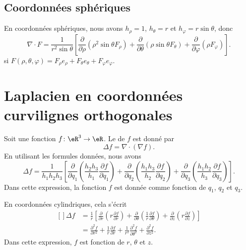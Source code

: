 \subsection{Coordonnées sphériques}

En coordonnées sphériques, nous avons $h_{\rho}=1$, $h_{\theta}=r$ et $h_{\varphi}=r\sin\theta$, donc
\begin{equation}
    \nabla\cdot F=\frac{1}{ r^2\sin\theta }\left[ \frac{ \partial  }{ \partial \rho }(\rho^2\sin\theta F_{\rho})+\frac{ \partial  }{ \partial \theta }(\rho\sin\theta F_{\theta})+\frac{ \partial  }{ \partial \varphi }(\rho F_{\varphi}) \right].
\end{equation}
si $F(\rho,\theta,\varphi)=F_{\rho}e_{\rho}+F_{\theta}e_{\theta}+F_{\varphi}e_{\varphi}$.

\section{Laplacien en coordonnées curvilignes orthogonales}

Soit une fonction $f\colon \eR^3\to \eR$. Le  de $f$ est donné par
\begin{equation}
    \Delta f=\nabla\cdot(\nabla f).
\end{equation}
En utilisant les formules données, nous avons
\begin{equation}
    \Delta f=\frac{1}{ h_1h_2h_3 }\left[ \frac{ \partial  }{ \partial q_1 }\left( \frac{ h_2h_3 }{ h_1 }\frac{ \partial f }{ \partial q_1 } \right)  +\frac{ \partial  }{ \partial q_2 }\left( \frac{ h_1h_3 }{ h_2 }\frac{ \partial f }{ \partial q_2 } \right)  +\frac{ \partial  }{ \partial q_3 }\left( \frac{ h_1h_2 }{ h_3 }\frac{ \partial f }{ \partial q_3 } \right)     \right].
\end{equation}
Dans cette expression, la fonction $f$ est donnée comme fonction de $q_1$, $q_2$ et $q_3$.

En coordonnées cylindriques, cela s'écrit
\begin{equation}
    \begin{aligned}[]
        \Delta f&=\frac{1}{ r }\left[ \frac{ \partial  }{ \partial r }\left( r\frac{ \partial f }{ \partial r } \right)+\frac{ \partial  }{ \partial \theta }\left( \frac{1}{ r }\frac{ \partial f }{ \partial \theta } \right)+\frac{ \partial  }{ \partial z }\left( r\frac{ \partial f }{ \partial z } \right) \right]\\
        &=\frac{ \partial^2f  }{ \partial r^2 }+\frac{1}{ r }\frac{ \partial f }{ \partial r }+\frac{1}{ r^2 }\frac{ \partial^2f }{ \partial \theta^2 }+\frac{ \partial^2f }{ \partial z^2 }.
    \end{aligned}
\end{equation}
Dans cette expression, $f$ est fonction de $r$, $\theta$ et $z$.

